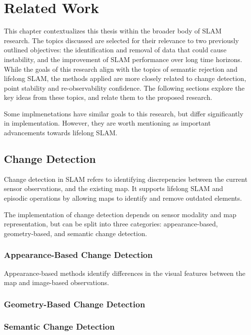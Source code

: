 \section{Related Work}
\label{sec:related_work}

This chapter contextualizes this thesis within the broader body of SLAM research. The topics discussed are selected for their relevance to two previously outlined objectives: the identification and removal of data that could cause instability, and the improvement of SLAM performance over long time horizons. While the goals of this research align with the topics of semantic rejection and lifelong SLAM, the methods applied are more closely related to change detection, point stability and re-observability confidence. The following sections explore the key ideas from these topics, and relate them to the proposed research.

Some implmenetations have similar goals to this research, but differ significantly in implementation. However, they are worth mentioning as important advancements towards lifelong SLAM.

\subsection{Change Detection}

Change detection in SLAM refers to identifying discrepencies between the current sensor observations, and the existing map. It supports lifelong SLAM and episodic operations by allowing maps to identify and remove outdated elements.

The implementation of change detection depends on sensor modality and map representation, but can be split into three categories: appearance-based, geometry-based, and semantic change detection.

\subsubsection{Appearance-Based Change Detection}

Appearance-based methods identify differences in the visual features between the map and image-based observations. 

\subsubsection{Geometry-Based Change Detection}

\subsubsection{Semantic Change Detection}

